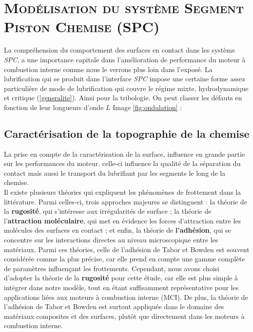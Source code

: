 \chapter{\textsc{Modélisation du système Segment Piston Chemise (SPC)}}\label{Modelisation}
La compréhension du comportement des surfaces en contact dans les système \emph{SPC}, a une importance capitale dans l'amélioration de performance du moteur à combustion interne comme nous le verrons plus loin dans l'exposé. La lubrification qui se produit dans l'interface \emph{SPC} impose une certaine forme assez particulière de mode de lubrification qui couvre le régime mixte, hydrodynamique et critique (\ref{generalite}). Ainsi pour la tribologie. On peut classer les défauts en fonction de leur longueurs d’onde $L$ Image \ref{fig:ondulation}  \cite{initiation} :

\section{Caractérisation de la topographie de la chemise}
La prise en compte de la caractérisation de la surface, influence en grande partie sur les performances du moteur. celle-ci influence la qualité de la séparation du contact mais aussi le transport du lubrifiant par les segments le long de la chemise.\\

Il existe plusieurs théories qui expliquent les phénomènes de frottement dans la littérature. Parmi celles-ci, trois approches majeures se distinguent : la théorie de la \textbf{rugosité}, qui s'intéresse aux irrégularités de surface ; la théorie de l'\textbf{attraction moléculaire}, qui met en évidence les forces d'attraction entre les molécules des surfaces en contact ; et enfin, la théorie de \textbf{l'adhésion}, qui se concentre sur les interactions directes au niveau microscopique entre les matériaux. Parmi ces théories, celle de l'adhésion de Tabor et Bowden est souvent considérée comme la plus précise, car elle prend en compte une gamme complète de paramètres influençant les frottements. Cependant, nous avons choisi d'adopter la théorie de la \textbf{rugosité} pour cette étude, car elle est plus simple à intégrer dans notre modèle, tout en étant suffisamment représentative pour les applications liées aux moteurs à combustion interne (MCI). De plus, la théorie de l'adhésion de Tabor et Bowden est surtout appliquée dans le domaine des matériaux composites et des surfaces, plutôt que directement dans les moteurs à combustion interne.\\


